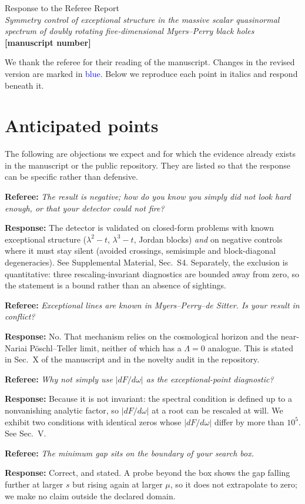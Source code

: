\documentclass[11pt]{article}
\newcommand{\TODO}[1]{\textbf{[#1]}}
\newcommand{\refpoint}[1]{\medskip\noindent\textbf{Referee:} \emph{#1}\par\medskip\noindent\textbf{Response:} }
\begin{document}
\begin{center}
{\Large Response to the Referee Report}\\[2mm]
\emph{Symmetry control of exceptional structure in the massive scalar
quasinormal spectrum of doubly rotating five-dimensional Myers--Perry black
holes}\\[2mm]
\TODO{manuscript number}
\end{center}

\noindent We thank the referee for their reading of the manuscript. Changes in
the revised version are marked in \textcolor{blue}{blue}. Below we reproduce
each point in italics and respond beneath it.

\section*{Anticipated points}

The following are objections we expect and for which the evidence already
exists in the manuscript or the public repository. They are listed so that the
response can be specific rather than defensive.

\refpoint{The result is negative; how do you know you simply did not look hard
enough, or that your detector could not fire?}
The detector is validated on closed-form problems with known exceptional
structure ($\lambda^2-t$, $\lambda^3-t$, Jordan blocks) \emph{and} on negative
controls where it must stay silent (avoided crossings, semisimple and
block-diagonal degeneracies). See Supplemental Material, Sec.~S4. Separately,
the exclusion is quantitative: three rescaling-invariant diagnostics are bounded
away from zero, so the statement is a bound rather than an absence of sightings.

\refpoint{Exceptional lines are known in Myers--Perry--de Sitter. Is your result
in conflict?}
No. That mechanism relies on the cosmological horizon and the near-Nariai
P\"oschl--Teller limit, neither of which has a $\Lambda=0$ analogue. This is
stated in Sec.~X of the manuscript and in the novelty audit in the repository.

\refpoint{Why not simply use $|dF/d\omega|$ as the exceptional-point diagnostic?}
Because it is not invariant: the spectral condition is defined up to a
nonvanishing analytic factor, so $|dF/d\omega|$ at a root can be rescaled at
will. We exhibit two conditions with identical zeros whose $|dF/d\omega|$ differ
by more than $10^5$. See Sec.~V.

\refpoint{The minimum gap sits on the boundary of your search box.}
Correct, and stated. A probe beyond the box shows the gap falling further at
larger $s$ but rising again at larger $\mu$, so it does not extrapolate to zero;
we make no claim outside the declared domain.
\end{document}

